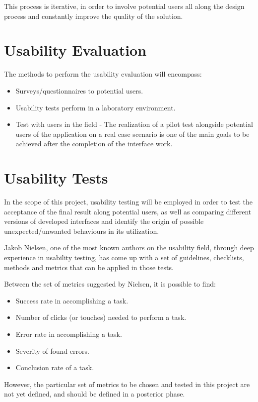 This process is iterative, in order to involve potential users all along the design process and constantly improve the quality of the solution.

\section{Usability Evaluation}

The methods to perform the usability evaluation will encompass: 

\begin{itemize}
\item Surveys/questionnaires to potential users.
\item Usability tests perform in a laboratory environment.
\item Test with users in the field - The realization of a pilot test alongside potential users of the application on a real case scenario is one of the main goals to be achieved after the completion of the interface work.
\end{itemize}

\section{Usability Tests}

In the scope of this project, usability testing will be employed in order to test the acceptance of the final result along potential users, as well as comparing different versions of developed interfaces and identify the origin of possible unexpected/unwanted behaviours in its utilization.

Jakob Nielsen, one of the most known authors on the usability field, through deep experience in usability testing, has come up with a set of guidelines, checklists, methods and metrics that can be applied in those tests.

Between the set of metrics suggested by Nielsen, it is possible to find: 

\begin{itemize}
\item Success rate in accomplishing a task.
\item Number of clicks (or touches) needed to perform a task.
\item Error rate in accomplishing a task.
\item Severity of found errors.
\item Conclusion rate of a task.
\end{itemize}

However, the particular set of metrics to be chosen and tested in this project are not yet defined, and should be  defined in a posterior phase.






